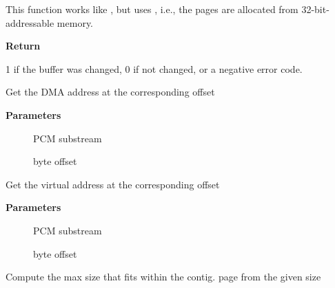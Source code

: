 \documentclass[a4paper,8pt,english]{sphinxmanual}
\begin{document}
This function works like , but uses
, i.e., the pages are allocated from 32-bit-addressable memory.

\textbf{Return}

1 if the buffer was changed, 0 if not changed, or a negative error
code.

\begin{fulllineitems}
\label{sound/kernel-api/alsa-driver-api:c.snd_pcm_sgbuf_get_addr}
Get the DMA address at the corresponding offset

\end{fulllineitems}


\textbf{Parameters}
\begin{description}
\item[{}] \leavevmode
PCM substream

\item[{}] \leavevmode
byte offset

\end{description}

\begin{fulllineitems}
\label{sound/kernel-api/alsa-driver-api:c.snd_pcm_sgbuf_get_ptr}
Get the virtual address at the corresponding offset

\end{fulllineitems}


\textbf{Parameters}
\begin{description}
\item[{}] \leavevmode
PCM substream

\item[{}] \leavevmode
byte offset

\end{description}

\begin{fulllineitems}
\label{sound/kernel-api/alsa-driver-api:c.snd_pcm_sgbuf_get_chunk_size}
Compute the max size that fits within the contig. page from the given size

\end{fulllineitems}
\end{document}
